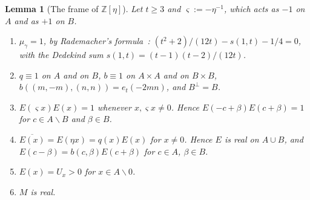 \documentclass[11pt]{amsart}
\numberwithin{equation}{section}
\theoremstyle{plain}
\newtheorem{lemma}[theorem]{Lemma}
\theoremstyle{definition}
\theoremstyle{remark}
\begin{document}
\begin{lemma}[{The frame of \(\mathbb Z[\eta]\)}]\label{lem:frameZ}
Let \(t\ge3\) and \(\varsigma:=-\eta^{-1}\), which acts as \(-1\) on \(A\) and as \(+1\) on \(B\).
\begin{enumerate}
\item[(a)] \(\mu_\gamma=1\), by Rademacher's formula~\cite{RG}: \((t^2+2)/(12t)-s(1,t)-1/4=0\), with the Dedekind sum \(s(1,t)=(t-1)(t-2)/(12t)\).
\item[(b)] \(q\equiv1\) on \(A\) and on \(B\), \(b\equiv1\) on \(A\times A\) and on \(B\times B\), \(b((m,-m),(n,n))=e_t(-2mn)\), and \(B^\perp=B\).
\item[(c)] \(E(\varsigma x)E(x)=1\) whenever \(x,\varsigma x\ne0\). Hence \(E(-c+\beta)E(c+\beta)=1\) for \(c\in A\smallsetminus B\) and \(\beta\in B\).
\item[(d)] \(\overline{E(x)}=E(\eta x)=q(x)E(x)\) for \(x\ne0\). Hence \(E\) is real on \(A\cup B\), and \(E(c-\beta)=b(c,\beta)E(c+\beta)\) for \(c\in A\), \(\beta\in B\).
\item[(e)] \(E(x)=U_x>0\) for \(x\in A\smallsetminus0\).
\item[(f)] \(M\) is real.
\end{enumerate}
\end{lemma}
\end{document}
